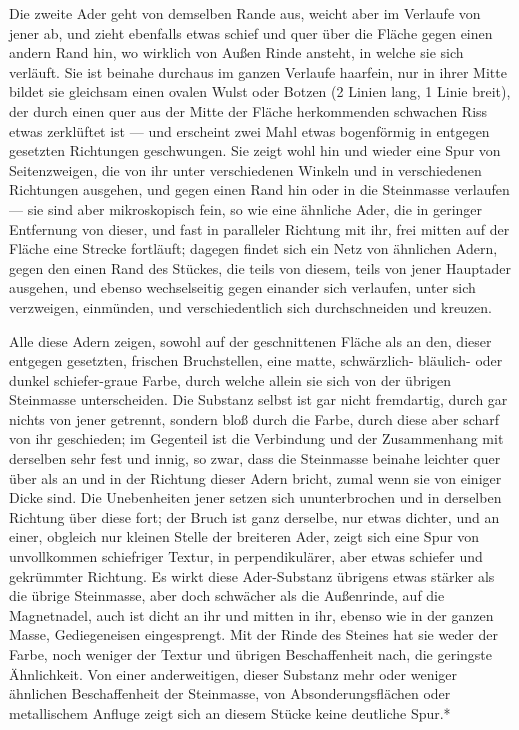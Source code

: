 \documentclass[a4paper, 11pt, oneside, german]{article}
\begin{document}
Die zweite Ader geht von demselben Rande aus, weicht aber im Verlaufe von jener ab, und zieht ebenfalls etwas schief und quer über die Fläche gegen einen andern Rand hin, wo wirklich von Außen Rinde ansteht, in welche sie sich verläuft. Sie ist beinahe durchaus im ganzen Verlaufe haarfein, nur in ihrer Mitte bildet sie gleichsam einen ovalen Wulst oder Botzen (2 Linien lang, 1 Linie breit), der durch einen quer aus der Mitte der Fläche herkommenden schwachen Riss etwas zerklüftet ist --- und erscheint zwei Mahl etwas bogenförmig in entgegen gesetzten Richtungen geschwungen. Sie zeigt wohl hin und wieder eine Spur von Seitenzweigen, die von ihr unter verschiedenen Winkeln und in verschiedenen Richtungen ausgehen, und gegen einen Rand hin oder in die Steinmasse verlaufen --- sie sind aber mikroskopisch fein, so wie eine ähnliche Ader, die in geringer Entfernung von dieser, und fast in paralleler Richtung mit ihr, frei mitten auf der Fläche eine Strecke fortläuft; dagegen findet sich ein Netz von ähnlichen Adern, gegen den einen Rand des Stückes, die teils von diesem, teils von jener Hauptader ausgehen, und ebenso wechselseitig gegen einander sich verlaufen, unter sich verzweigen, einmünden, und verschiedentlich sich durchschneiden und kreuzen.

Alle diese Adern zeigen, sowohl auf der geschnittenen Fläche als an den, dieser entgegen gesetzten, frischen Bruchstellen, eine matte, schwärzlich- bläulich- oder dunkel schiefer-graue Farbe, durch welche allein sie sich von der übrigen Steinmasse unterscheiden. Die Substanz selbst ist gar nicht fremdartig, durch gar nichts von jener getrennt, sondern bloß durch die Farbe, durch diese aber scharf von ihr geschieden; im Gegenteil ist die Verbindung und der Zusammenhang mit derselben sehr fest und innig, so zwar, dass die Steinmasse beinahe leichter quer über als an und in der Richtung dieser Adern bricht, zumal wenn sie von einiger Dicke sind. Die Unebenheiten jener setzen sich ununterbrochen und in derselben Richtung über diese fort; der Bruch ist ganz derselbe, nur etwas dichter, und an einer, obgleich nur kleinen Stelle der breiteren Ader, zeigt sich eine Spur von unvollkommen schiefriger Textur, in perpendikulärer, aber etwas schiefer und gekrümmter Richtung. Es wirkt diese Ader-Substanz übrigens etwas stärker als die übrige Steinmasse, aber doch schwächer als die Außenrinde, auf die Magnetnadel, auch ist dicht an ihr und mitten in ihr, ebenso wie in der ganzen Masse, Gediegeneisen eingesprengt. Mit der Rinde des Steines hat sie weder der Farbe, noch weniger der Textur und übrigen Beschaffenheit nach, die geringste Ähnlichkeit. Von einer anderweitigen, dieser Substanz mehr oder weniger ähnlichen Beschaffenheit der Steinmasse, von Absonderungsflächen oder metallischem Anfluge zeigt sich an diesem Stücke keine deutliche Spur.*
\end{document}
